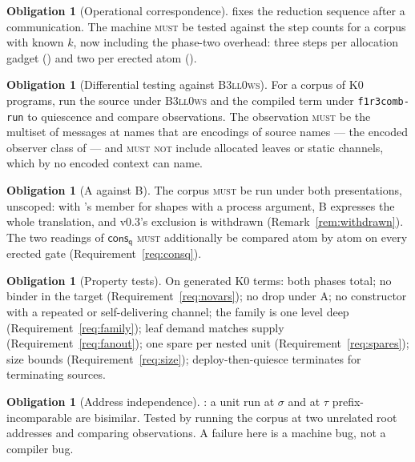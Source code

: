 \documentclass[11pt,a4paper]{article}
\newcommand{\code}[1]{\texttt{#1}}
\newcommand{\Bell}{\textsc{B3ll0ws}}
\newcommand{\MUST}{\textsc{must}}
\newcommand{\MUSTNOT}{\textsc{must not}}
\newcommand{\qq}{\mathsf{q}}
\newcommand{\cons}{\mathsf{cons}}
\theoremstyle{definition}
\newtheorem{obligation}[definition]{Obligation}
\theoremstyle{plain}
\begin{document}
\begin{obligation}[Operational correspondence]\label{obl:opcorr}
\cite[Lem.~7.7]{draft3} fixes the reduction sequence after a communication.
The machine \MUST{} be tested against the step counts for a corpus with known
$k$, now including the phase-two overhead: three steps per allocation gadget
(\cite[Lem.~6.7]{draft3}) and two per erected atom
(\cite[Rem.~3.11]{draft3}).
\end{obligation}

\begin{obligation}[Differential testing against \Bell]\label{obl:diff}
For a corpus of K0 programs, run the source under \Bell{} and the compiled
term under \code{f1r3comb-run} to quiescence and compare observations. The
observation \MUST{} be the multiset of messages at names that are encodings of
source names --- the encoded observer class of \cite[Thm.~7.9]{draft3} --- and
\MUSTNOT{} include allocated leaves or static channels, which by
\cite[Lem.~7.6]{draft3} no encoded context can name.
\end{obligation}

\begin{obligation}[A against B]\label{obl:AB}
The corpus \MUST{} be run under both presentations, unscoped: with
\cite[Def.~3.8]{draft3}'s member for shapes with a process argument, B
expresses the whole translation, and v0.3's exclusion is withdrawn
(Remark~\ref{rem:withdrawn}). The two readings of $\cons_{\qq}$ \MUST{}
additionally be compared atom by atom on every erected gate
(Requirement~\ref{req:consq}).
\end{obligation}

\begin{obligation}[Property tests]\label{obl:prop}
On generated K0 terms: both phases total; no binder in the target
(Requirement~\ref{req:novars}); no drop under A; no constructor with a
repeated or self-delivering channel; the family is one level deep
(Requirement~\ref{req:family}); leaf demand matches supply
(Requirement~\ref{req:fanout}); one spare per nested unit
(Requirement~\ref{req:spares}); size bounds
(Requirement~\ref{req:size}); deploy-then-quiesce terminates for terminating
sources.
\end{obligation}

\begin{obligation}[Address independence]\label{obl:addr}
\cite[Lem.~7.8]{draft3}: a unit run at $\sigma$ and at $\tau$
prefix-incomparable are bisimilar. Tested by running the corpus at two
unrelated root addresses and comparing observations. A failure here is a
machine bug, not a compiler bug.
\end{obligation}
\end{document}

